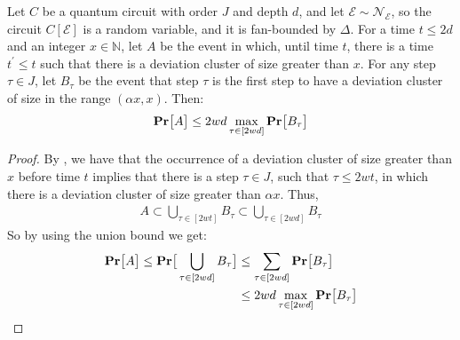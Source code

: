 \begin{claim}
Let $C$ be a quantum circuit with order $J$ and depth $d$, and let $\mathcal{E} \sim \mathcal{N}_{\mathcal{E}}$, so the circuit $C[\mathcal{E}]$ is a random variable, and it is fan-bounded by $\Delta$. For a time $t \le 2d$ and an integer $x \in \mathbb{N}$, let $A$ be the event in which, until time $t$, there is a time $t^{\prime} \le t$ such that there is a deviation cluster of size greater than $x$. For any step $\tau \in J$, let $B_{\tau}$ be the event that step $\tau$ is the first step to have a deviation cluster of size in the range $(\alpha x, x)$. Then:
  \begin{equation*}
    \begin{split}
      \mathbf{Pr} \big[ A \big] \le 2wd\max_{\tau \in [2wd]}\mathbf{Pr} \big[ B_{\tau} \big]
    \end{split}
  \end{equation*}
\end{claim}
\begin{proof}
By , we have that the occurrence of a deviation cluster of size greater than $x$ before time $t$ implies that there is a step $\tau \in J$, such that $\tau \le 2wt$, in which there is a deviation cluster of size greater than $\alpha x$. Thus,
  \begin{equation*}
    \begin{split}
      A \subset \bigcup_{\tau \in [2wt]} B_{\tau} \subset \bigcup_{\tau \in [2wd]} B_{\tau}
    \end{split}
  \end{equation*}
  So by using the union bound we get:
  \begin{equation*}
    \begin{split}
      \mathbf{Pr} \big[ A \big]  \le \mathbf{Pr} \big[ \bigcup_{\tau \in [2wd]} B_{\tau}  \big] & \le \sum_{\tau \in [2wd]}\mathbf{Pr} \big[  B_{\tau}  \big] \\
      &\le 2wd\max_{\tau \in [2wd]}\mathbf{Pr} \big[ B_{\tau} \big]
    \end{split}
  \end{equation*}
\end{proof}

